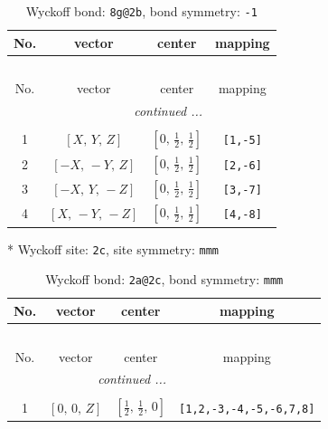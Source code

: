 \documentclass[fleqn,8pt]{jsarticle}
\begin{document}
\begin{longtable}{cccc}
\caption{Wyckoff bond: {\tt 8g@2b}, bond symmetry: {\tt -1}}
 \\
 \hline \hline
No. & vector & center & mapping \\ \hline \endfirsthead

\multicolumn{3}{l}{\tablename\ \thetable{}} \\
 \hline \hline
No. & vector & center & mapping \\ \hline \endhead

 \hline \hline
\multicolumn{3}{r}{\footnotesize\it continued ...} \\ \endfoot

 \hline \hline
\multicolumn{3}{r}{} \\ \endlastfoot

1 & $\left[ X,\, Y,\, Z \right]$ & $\left[ 0,\, \frac{1}{2},\, \frac{1}{2} \right]$ & {\tt [1,-5]} \\ \hline
2 & $\left[ - X,\, - Y,\, Z \right]$ & $\left[ 0,\, \frac{1}{2},\, \frac{1}{2} \right]$ & {\tt [2,-6]} \\ \hline
3 & $\left[ - X,\, Y,\, - Z \right]$ & $\left[ 0,\, \frac{1}{2},\, \frac{1}{2} \right]$ & {\tt [3,-7]} \\ \hline
4 & $\left[ X,\, - Y,\, - Z \right]$ & $\left[ 0,\, \frac{1}{2},\, \frac{1}{2} \right]$ & {\tt [4,-8]} \\
\end{longtable}
* Wyckoff site: {\tt 2c}, site symmetry: {\tt mmm}
\renewcommand{\arraystretch}{1.2}
\begin{longtable}{cccc}
\caption{Wyckoff bond: {\tt 2a@2c}, bond symmetry: {\tt mmm}}
 \\
 \hline \hline
No. & vector & center & mapping \\ \hline \endfirsthead

\multicolumn{3}{l}{\tablename\ \thetable{}} \\
 \hline \hline
No. & vector & center & mapping \\ \hline \endhead

 \hline \hline
\multicolumn{3}{r}{\footnotesize\it continued ...} \\ \endfoot

 \hline \hline
\multicolumn{3}{r}{} \\ \endlastfoot

1 & $\left[ 0,\, 0,\, Z \right]$ & $\left[ \frac{1}{2},\, \frac{1}{2},\, 0 \right]$ & {\tt [1,2,-3,-4,-5,-6,7,8]} \\
\end{longtable}
\end{document}
